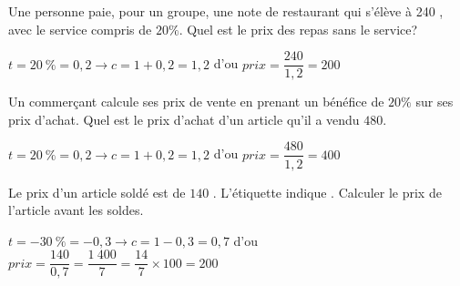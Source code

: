 \documentclass[11pt,a4paper]{article}  %
\begin{document}
\begin{enumMet}
	\item Une personne paie, pour un groupe, une note de restaurant qui s'élève à 240 \EUR{}, avec le service compris de $20 \%$. Quel est le prix des repas sans le service?
	\begin{corrBox}
		$t=20\ \%=0,2\longrightarrow c=1+0,2=1,2$ d'ou $prix=\dfrac{240}{1,2}=200$ \EUR{}		
	\end{corrBox}
	\item Un commerçant calcule ses prix de vente en prenant un bénéfice de $20 \%$ sur ses prix d'achat. Quel est le prix d'achat d'un article qu'il a vendu $480$\EUR{}.
	\begin{corrBox}
		$t=20\ \%=0,2\longrightarrow c=1+0,2=1,2$ d'ou $prix=\dfrac{480}{1,2}=400$ \EUR{}		
	\end{corrBox}
	\item Le prix d'un article soldé est de $140$ \EUR{}. L'étiquette indique . Calculer le prix de l'article avant les soldes.
	\begin{corrBox}
		$t=-30\ \%=-0,3\longrightarrow c=1-0,3=0,7$ d'ou $prix=\dfrac{140}{0,7}=\dfrac{1\ 400}{7}=\dfrac{14}{7}\times 100=200$ \EUR{}		
	\end{corrBox}
\end{enumMet}
\end{document}
